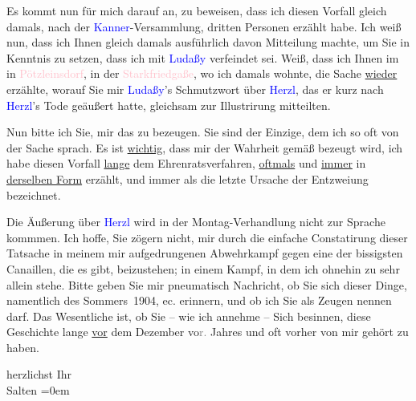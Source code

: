 \pstart
           Es kommt nun für mich darauf an, zu beweisen, dass ich diesen Vorfall gleich damals,
               nach der \textcolor{blue}{Kanner}{}\ledrightnote{\textcolor{blue}{Heinrich Kanner}}-Versammlung, dritten Personen
               erzählt habe. Ich weiß nun, dass ich Ihnen gleich damals ausführlich davon Mitteilung
               machte, um Sie in Kenntnis zu setzen, dass ich mit \textcolor{blue}{Ludaßy}{}\ledrightnote{\textcolor{blue}{Julius von Gans-Ludassy}} verfeindet sei. Weiß, dass ich Ihnen im \label{K_L03434-4v}\label{K_L03434-4h} in \textcolor{pink}{Pötzleinsdorf}{}\ledrightnote{\textcolor{pink}{Pötzleinsdorf}}, in der \textcolor{pink}{Starkfriedgaße}{}\ledrightnote{\textcolor{pink}{Starkfriedgassse}}, wo ich damals wohnte, die Sache \uline{wieder} erzählte, worauf Sie mir \textcolor{blue}{Ludaßy}{}\ledrightnote{\textcolor{blue}{Julius von Gans-Ludassy}}’s Schmutzwort über \textcolor{blue}{Herzl}{}\ledrightnote{\textcolor{blue}{Theodor Herzl}}, das er kurz nach \textcolor{blue}{Herzl}{}\ledrightnote{\textcolor{blue}{Theodor Herzl}}’s Tode
               geäußert hatte, gleichsam zur Illustrirung mitteilten.\pend
           
\pstart
           Nun bitte ich Sie, mir das zu bezeugen. Sie sind der Einzige, dem ich so oft von der
               Sache sprach. Es ist \uline{wichtig}, dass mir der Wahrheit
               gemäß bezeugt wird, ich habe diesen Vorfall \uline{lange}{ } dem Ehrenratsverfahren, \uline{oftmals} und \uline{immer} in \uline{der{\pb}selben Form} erzählt, und immer als die letzte Ursache der Entzweiung
               bezeichnet.\pend
           
\pstart
           Die Äußerung über \textcolor{blue}{Herzl}{}\ledrightnote{\textcolor{blue}{Theodor Herzl}} wird in der Montag-Verhandlung nicht zur Sprache kommmen. Ich hoffe,
               Sie zögern nicht, mir durch die einfache Constatirung dieser Tatsache in meinem \introOben{}mir\introOben{} aufgedrungenen Abwehrkampf gegen eine der bissigsten
               Canaillen, die es gibt, beizustehen; in einem Kampf, in dem ich ohnehin zu sehr
               allein stehe. Bitte geben Sie mir pneumatisch Nachricht, ob Sie sich dieser Dinge,
               namentlich des Sommers 1904, ec. erinnern, und ob ich Sie
               als Zeugen nennen darf. Das Wesentliche ist, ob Sie – wie ich annehme – Sich
               besinnen, diese Geschichte lange \uline{vor} dem Dezember vo\textcolor{gray}{r.} Jahres und oft vorher von
               mir gehört zu haben.\pend
           
\pstart
           herzlichst Ihr {\\[\baselineskip]}\spacefill\mbox{Salten}\pend
           \leftskip=0em{}\endnumbering{}  
      